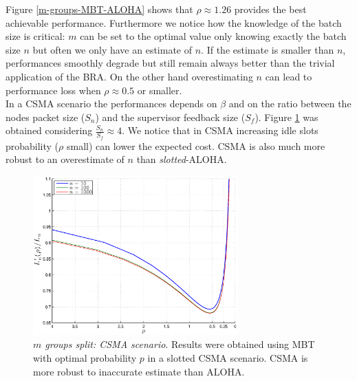 \documentclass[11pt,a4paper,twoside,openright]{book}
\begin{document}
Figure \ref{m-groups-MBT-ALOHA} shows that  $\rho\approx 1.26$ provides the best achievable performance. Furthermore we notice how the knowledge of the batch size is critical: $m$ can be set to the optimal value only knowing exactly the batch size $n$ but often we only have an estimate of $n$. If the estimate is smaller than $n$, performances smoothly degrade but still remain always better than the trivial application of the BRA. On the other hand overestimating $n$ can lead to performance loss when $\rho \approx 0.5$ or smaller.\\

In a CSMA scenario the performances depends on $\beta$ and on the ratio between the nodes packet size ($S_{n}$) and the supervisor feedback size ($S_{f}$). Figure \ref{m-groups-MBT-CSMA} was obtained considering $\displaystyle\frac{S_{n}}{S_{f}}\approx4$. We notice that in CSMA increasing idle slots probability ($\rho$ small) can lower the expected cost. CSMA is also much more robust to an overestimate of $n$ than \emph{slotted}-ALOHA.

\begin{figure}[H]
\begin{center}
\includegraphics[width=0.7\textwidth]{matlab/BTs/m-groups-MBT-CSMA}
\caption[$m$ groups split: CSMA scenario]{\emph{$m$ groups split: CSMA scenario}. Results were obtained using MBT with optimal probability $p$ in a slotted CSMA scenario. CSMA is more robust to inaccurate estimate than ALOHA.}
\label{m-groups-MBT-CSMA}
\end{center}
\end{figure}
\end{document}
